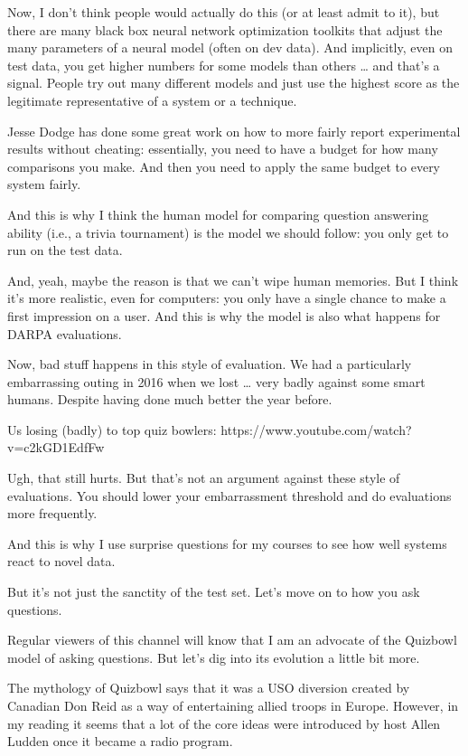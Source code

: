 Now, I don’t think people would actually do this (or at least admit to it), but there are many black box neural network optimization toolkits that adjust the many parameters of a neural model (often on dev data).  And implicitly, even on test data, you get higher numbers for some models than others … and that’s a signal.  People try out many different models and just use the highest score as the legitimate representative of a system or a technique.

Jesse Dodge has done some great work on how to more fairly report experimental results without cheating: essentially, you need to have a budget for how many comparisons you make.  And then you need to apply the same budget to every system fairly.

And this is why I think the human model for comparing question answering ability (i.e., a trivia tournament) is the model we should follow: you only get to run on the test data. 

And, yeah, maybe the reason is that we can’t wipe human memories.  But I think it’s more realistic, even for computers: you only have a single chance to make a first impression on a user.  And this is why the model is also what happens for DARPA evaluations.

Now, bad stuff happens in this style of evaluation.  We had a particularly embarrassing outing in 2016 when we lost … very badly against some smart humans.  Despite having done much better the year before. 

Us losing (badly) to top quiz bowlers:
https://www.youtube.com/watch?v=c2kGD1EdfFw

Ugh, that still hurts. But that’s not an argument against these style of evaluations.  You should lower your embarrassment threshold and do evaluations more frequently.

And this is why I use surprise questions for my courses to see how well systems react to novel data.

But it’s not just the sanctity of the test set.  Let’s move on to how you ask questions.

Regular viewers of this channel will know that I am an advocate of the Quizbowl model of asking questions.  But let’s dig into its evolution a little bit more.  

The mythology of Quizbowl says that it was a USO diversion created by Canadian Don Reid as a way of entertaining allied troops in Europe.  However, in my reading it seems that a lot of the core ideas were introduced by host Allen Ludden once it became a radio program.  

